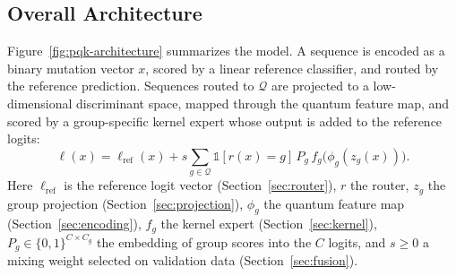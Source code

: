 \documentclass[conference]{IEEEtran}
\begin{document}
\subsection{Overall Architecture}
\label{sec:architecture}

Figure~\ref{fig:pqk-architecture} summarizes the model. A sequence is encoded as a binary mutation vector $x$, scored by a linear reference classifier, and routed by the reference prediction. Sequences routed to $\mathcal{Q}$ are projected to a low-dimensional discriminant space, mapped through the quantum feature map, and scored by a group-specific kernel expert whose output is added to the reference logits:
\begin{equation}
    \ell(x)=\ell_{\mathrm{ref}}(x)
    +s\sum_{g\in\mathcal{Q}}\mathbb{1}[r(x)=g]\,P_g\,f_g\!\big(\phi_g(z_g(x))\big).
    \label{eq:master}
\end{equation}
Here $\ell_{\mathrm{ref}}$ is the reference logit vector (Section~\ref{sec:router}), $r$ the router, $z_g$ the group projection (Section~\ref{sec:projection}), $\phi_g$ the quantum feature map (Section~\ref{sec:encoding}), $f_g$ the kernel expert (Section~\ref{sec:kernel}), $P_g\in\{0,1\}^{C\times C_g}$ the embedding of group scores into the $C$ logits, and $s\ge 0$ a mixing weight selected on validation data (Section~\ref{sec:fusion}).
\end{document}
